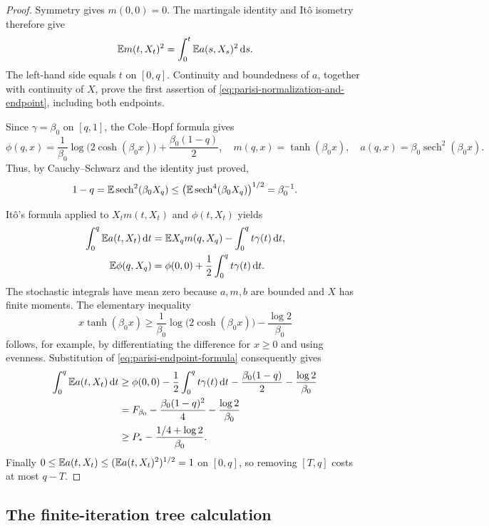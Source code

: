 \begin{proof}
Symmetry gives $m(0,0)=0$.  The martingale identity and It\^o isometry
therefore give
\[
 \mathbb E m(t,X_t)^2=\int_0^t\mathbb E a(s,X_s)^2\,\mathrm d s.
\]
The left-hand side equals $t$ on $[0,q]$.  Continuity and boundedness
of $a$, together with continuity of $X$, prove the first assertion of
\eqref{eq:parisi-normalization-and-endpoint}, including both endpoints.

Since $\gamma=\beta_0$ on $[q,1]$, the Cole--Hopf formula gives
\begin{equation}
 \phi(q,x)=\frac1{\beta_0}\log\bigl(2\cosh(\beta_0x)\bigr)
                  +\frac{\beta_0(1-q)}2,
 \quad
 m(q,x)=\tanh(\beta_0x),
 \quad
 a(q,x)=\beta_0\operatorname{sech}^2(\beta_0x).
 \label{eq:parisi-endpoint-formula}
\end{equation}
Thus, by Cauchy--Schwarz and the identity just proved,
\[
 1-q=\mathbb E\operatorname{sech}^2(\beta_0X_q)
 \le\bigl(\mathbb E\operatorname{sech}^4(\beta_0X_q)\bigr)^{1/2}
 =\beta_0^{-1}.
\]

It\^o's formula applied to $X_tm(t,X_t)$ and $\phi(t,X_t)$ yields
\begin{align*}
 \int_0^q\mathbb E a(t,X_t)\,\mathrm d t
   &=\mathbb E X_qm(q,X_q)-\int_0^qt\gamma(t)\,\mathrm d t,\\
 \mathbb E\phi(q,X_q)
   &=\phi(0,0)+\frac12\int_0^qt\gamma(t)\,\mathrm d t.
\end{align*}
The stochastic integrals have mean zero because $a,m,b$ are bounded
and $X$ has finite moments.  The elementary inequality
\[
 x\tanh(\beta_0x)
 \ge\frac1{\beta_0}\log\bigl(2\cosh(\beta_0x)\bigr)
              -\frac{\log2}{\beta_0}
\]
follows, for example, by differentiating the difference for $x\ge0$
and using evenness.  Substitution of
\eqref{eq:parisi-endpoint-formula} consequently gives
\begin{align*}
 \int_0^q\mathbb E a(t,X_t)\,\mathrm d t
 &\ge\phi(0,0)-\frac12\int_0^qt\gamma(t)\,\mathrm d t
                -\frac{\beta_0(1-q)}2-\frac{\log2}{\beta_0}\\
 &=F_{\beta_0}-\frac{\beta_0(1-q)^2}{4}
                       -\frac{\log2}{\beta_0}\\
 &\ge P_*-\frac{1/4+\log2}{\beta_0}.
\end{align*}
Finally $0\le\mathbb E a(t,X_t)\le(\mathbb E a(t,X_t)^2)^{1/2}=1$ on
$[0,q]$, so removing $[T,q]$ costs at most $q-T$.
\end{proof}

\subsection{The finite-iteration tree calculation}

